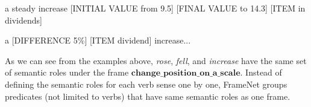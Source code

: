 a steady increase [INITIAL VALUE from 9.5] [FINAL VALUE to 14.3] [ITEM in dividends]

a [DIFFERENCE 5\%] [ITEM dividend] increase... 

As we can see from the examples above, \textit{rose}, \textit{fell}, and \textit{increase} have the same set of semantic roles under the frame $\mathbf{change\_position\_on\_a\_scale}$. Instead of defining the semantic roles for each verb sense one by one, FrameNet groups predicates (not limited to verbs) that have same semantic roles as one frame.
%
%
%
%

